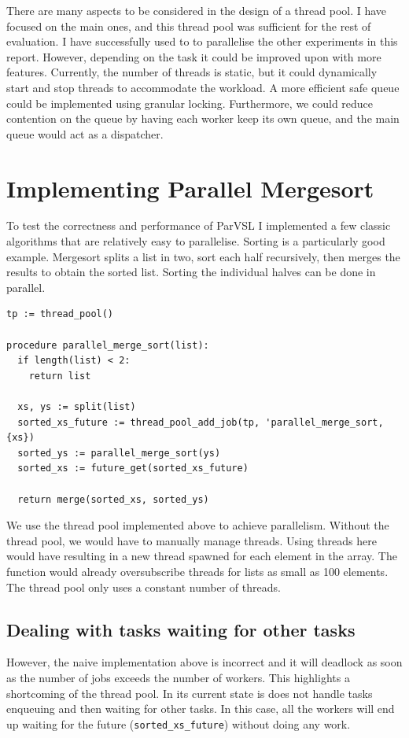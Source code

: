 There are many aspects to be considered in the design of a thread pool. I have focused on the main ones, and
this thread pool was sufficient for the rest of evaluation. I have successfully used to to parallelise the
other experiments in this report. However, depending on the task it could be improved upon with more features.
Currently, the number of threads is static, but it could dynamically start and stop threads to accommodate
the workload. A more efficient safe queue could be implemented using granular locking. Furthermore, we could
reduce contention on the queue by having each worker keep its own queue, and the main queue would act as a
dispatcher.

\section{Implementing Parallel Mergesort}

To test the correctness and performance of ParVSL I implemented a few classic algorithms that are relatively
easy to parallelise. Sorting is a particularly good example. Mergesort splits a list in two, sort each half
recursively, then merges the results to obtain the sorted list. Sorting the individual halves can be done
in parallel.

\begin{verbatim}
tp := thread_pool()

procedure parallel_merge_sort(list):
  if length(list) < 2:
    return list

  xs, ys := split(list)
  sorted_xs_future := thread_pool_add_job(tp, 'parallel_merge_sort, {xs})
  sorted_ys := parallel_merge_sort(ys)
  sorted_xs := future_get(sorted_xs_future)

  return merge(sorted_xs, sorted_ys)
\end{verbatim}

We use the thread pool implemented above to achieve parallelism. Without the thread pool, we would
have to manually manage threads. Using threads here would have resulting in a new thread spawned for
each element in the array. The function would already oversubscribe threads for lists as small as
100 elements. The thread pool only uses a constant number of threads.

\subsection{Dealing with tasks waiting for other tasks}

However, the naive implementation above is incorrect and it will deadlock as soon as the number of
jobs exceeds the number of workers. This highlights a shortcoming of the thread pool. In its current
state is does not handle tasks enqueuing and then waiting for other tasks. In this case, all the workers
will end up waiting for the future (\texttt{sorted\_xs\_future}) without doing any work.

